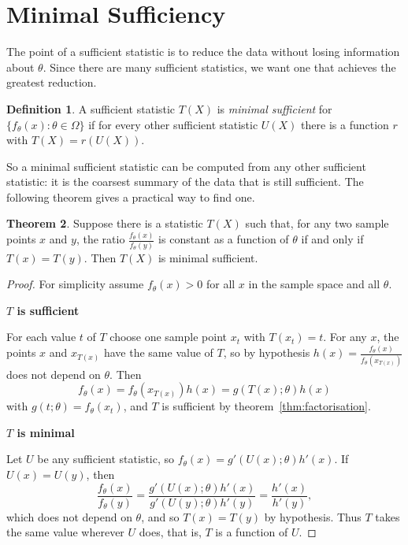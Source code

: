 \documentclass[12pt,a4paper]{report}
\theoremstyle{definition}
\newtheorem{thm}{Theorem}[section]
\newtheorem{defn}[thm]{Definition}
\newcommand{\subhead}[1]{%
  \par\medskip\noindent\textbf{#1}\par\nobreak\smallskip}
\begin{document}
\section{Minimal Sufficiency}

The point of a sufficient statistic is to reduce the data without losing
information about $\theta$. Since there are many sufficient statistics, we want
one that achieves the greatest reduction.

\begin{defn}
\label{def:minimal}
A sufficient statistic $T(X)$ is \emph{minimal sufficient} for
$\{f_\theta(x) : \theta\in\Omega\}$ if for every other sufficient statistic $U(X)$
there is a function $r$ with $T(X) = r(U(X))$.
\end{defn}

So a minimal sufficient statistic can be computed from any other sufficient
statistic: it is the coarsest summary of the data that is still sufficient.
The following theorem gives a practical way to find one.

\begin{thm}
\label{thm:minimalratio}
Suppose there is a statistic $T(X)$ such that, for any two sample points $x$ and
$y$, the ratio $\frac{f_\theta(x)}{f_\theta(y)}$ is constant as a function of
$\theta$ if and only if $T(x) = T(y)$. Then $T(X)$ is minimal sufficient.
\end{thm}

\begin{proof}
For simplicity assume $f_\theta(x)>0$ for all $x$ in the sample space and all
$\theta$.

\subhead{$T$ is sufficient}
For each value $t$ of $T$ choose one sample point $x_t$ with $T(x_t) = t$. For any
$x$, the points $x$ and $x_{T(x)}$ have the same value of $T$, so by hypothesis
$h(x) = \frac{f_\theta(x)}{f_\theta(x_{T(x)})}$ does not depend on $\theta$. Then
\[f_\theta(x) = f_\theta\left(x_{T(x)}\right)h(x) = g(T(x);\theta)h(x)\]
with $g(t;\theta) = f_\theta(x_t)$, and $T$ is sufficient by
theorem~\ref{thm:factorisation}.

\subhead{$T$ is minimal}
Let $U$ be any sufficient statistic, so $f_\theta(x) = g'(U(x);\theta)h'(x)$. If
$U(x) = U(y)$, then
\[\frac{f_\theta(x)}{f_\theta(y)} = \frac{g'(U(x);\theta)h'(x)}{g'(U(y);\theta)h'(y)} = \frac{h'(x)}{h'(y)},\]
which does not depend on $\theta$, and so $T(x) = T(y)$ by hypothesis. Thus $T$
takes the same value wherever $U$ does, that is, $T$ is a function of $U$.
\end{proof}
\end{document}
